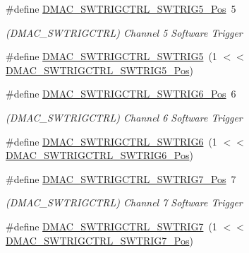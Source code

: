 \begin{DoxyCompactItemize}
\item 
\#define \mbox{\hyperlink{group___s_a_m_d21___d_m_a_c_ga6d1bfd2314018c1e448892ddc579bb0f}{D\+M\+A\+C\+\_\+\+S\+W\+T\+R\+I\+G\+C\+T\+R\+L\+\_\+\+S\+W\+T\+R\+I\+G5\+\_\+\+Pos}}~5
\begin{DoxyCompactList}\small\item\em (D\+M\+A\+C\+\_\+\+S\+W\+T\+R\+I\+G\+C\+T\+RL) Channel 5 Software Trigger \end{DoxyCompactList}\item 
\#define \mbox{\hyperlink{group___s_a_m_d21___d_m_a_c_gaf666a1ad84471a2b87266ae427e69b5e}{D\+M\+A\+C\+\_\+\+S\+W\+T\+R\+I\+G\+C\+T\+R\+L\+\_\+\+S\+W\+T\+R\+I\+G5}}~(1 $<$$<$ \mbox{\hyperlink{group___s_a_m_d21___d_m_a_c_ga6d1bfd2314018c1e448892ddc579bb0f}{D\+M\+A\+C\+\_\+\+S\+W\+T\+R\+I\+G\+C\+T\+R\+L\+\_\+\+S\+W\+T\+R\+I\+G5\+\_\+\+Pos}})
\item 
\#define \mbox{\hyperlink{group___s_a_m_d21___d_m_a_c_ga141efe2f93312e6265efd668ebb2da10}{D\+M\+A\+C\+\_\+\+S\+W\+T\+R\+I\+G\+C\+T\+R\+L\+\_\+\+S\+W\+T\+R\+I\+G6\+\_\+\+Pos}}~6
\begin{DoxyCompactList}\small\item\em (D\+M\+A\+C\+\_\+\+S\+W\+T\+R\+I\+G\+C\+T\+RL) Channel 6 Software Trigger \end{DoxyCompactList}\item 
\#define \mbox{\hyperlink{group___s_a_m_d21___d_m_a_c_ga9be77ec68ecf5349adee987101de5d92}{D\+M\+A\+C\+\_\+\+S\+W\+T\+R\+I\+G\+C\+T\+R\+L\+\_\+\+S\+W\+T\+R\+I\+G6}}~(1 $<$$<$ \mbox{\hyperlink{group___s_a_m_d21___d_m_a_c_ga141efe2f93312e6265efd668ebb2da10}{D\+M\+A\+C\+\_\+\+S\+W\+T\+R\+I\+G\+C\+T\+R\+L\+\_\+\+S\+W\+T\+R\+I\+G6\+\_\+\+Pos}})
\item 
\#define \mbox{\hyperlink{group___s_a_m_d21___d_m_a_c_gae6013d5233071b7ca12b65bc868eae19}{D\+M\+A\+C\+\_\+\+S\+W\+T\+R\+I\+G\+C\+T\+R\+L\+\_\+\+S\+W\+T\+R\+I\+G7\+\_\+\+Pos}}~7
\begin{DoxyCompactList}\small\item\em (D\+M\+A\+C\+\_\+\+S\+W\+T\+R\+I\+G\+C\+T\+RL) Channel 7 Software Trigger \end{DoxyCompactList}\item 
\#define \mbox{\hyperlink{group___s_a_m_d21___d_m_a_c_gad8cbc8c3fbbd3a66a331117b6365aef2}{D\+M\+A\+C\+\_\+\+S\+W\+T\+R\+I\+G\+C\+T\+R\+L\+\_\+\+S\+W\+T\+R\+I\+G7}}~(1 $<$$<$ \mbox{\hyperlink{group___s_a_m_d21___d_m_a_c_gae6013d5233071b7ca12b65bc868eae19}{D\+M\+A\+C\+\_\+\+S\+W\+T\+R\+I\+G\+C\+T\+R\+L\+\_\+\+S\+W\+T\+R\+I\+G7\+\_\+\+Pos}})
\item 
$$
\end{DoxyCompactItemize}

